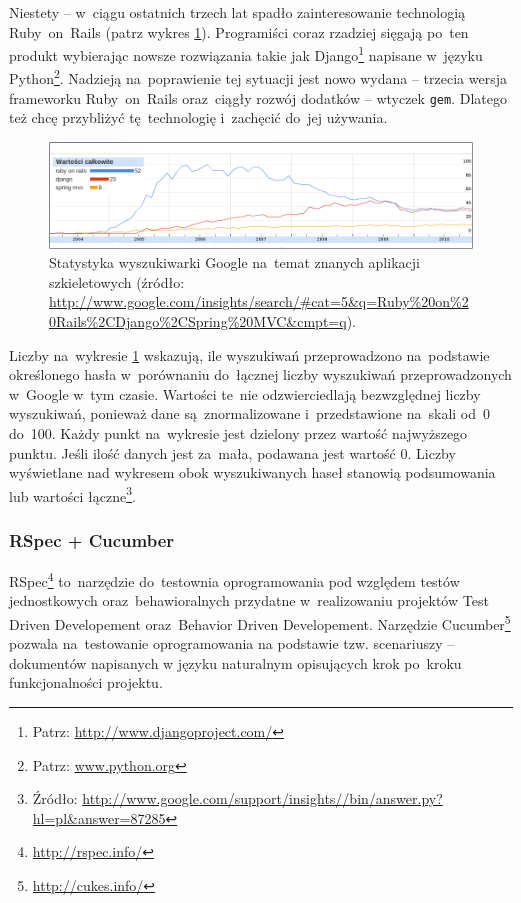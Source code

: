 Niestety -- w~ciągu ostatnich trzech lat spadło zainteresowanie technologią Ruby~on~Rails (patrz wykres \ref{fig.wykres.googleresearch}). Programiści coraz rzadziej sięgają po~ten produkt wybierając nowsze rozwiązania takie jak Django\footnote{Patrz: \url{http://www.djangoproject.com/}} napisane w~języku Python\footnote{Patrz: \url{www.python.org}}. Nadzieją na~poprawienie tej sytuacji jest nowo wydana -- trzecia wersja frameworku Ruby~on~Rails oraz~ciągły rozwój dodatków -- wtyczek \texttt{gem}. Dlatego też chcę przybliżyć tę~technologię i~zachęcić do~jej używania.

\begin{figure}[!t]
\centering
\includegraphics[width=\textwidth]{obrazki/googleresearch.png}
\caption{Statystyka wyszukiwarki Google na~temat znanych aplikacji szkieletowych (źródło: \url{http://www.google.com/insights/search/\#cat=5\&q=Ruby\%20on\%20Rails\%2CDjango\%2CSpring\%20MVC\&cmpt=q}).}
\label{fig.wykres.googleresearch}
\end{figure}

Liczby na~wykresie \ref{fig.wykres.googleresearch} wskazują, ile wyszukiwań przeprowadzono na~podstawie określonego hasła w~porównaniu do~łącznej liczby wyszukiwań przeprowadzonych w~Google w~tym czasie. Wartości te~nie odzwierciedlają bezwzględnej liczby wyszukiwań, ponieważ dane są~znormalizowane i~przedstawione na~skali od~0 do~100. Każdy punkt na~wykresie jest dzielony przez wartość najwyższego punktu. Jeśli ilość danych jest za~mała, podawana jest wartość 0. Liczby wyświetlane nad wykresem obok wyszukiwanych haseł stanowią podsumowania lub wartości łączne\footnote{Źródło: \url{http://www.google.com/support/insights//bin/answer.py?hl=pl\&answer=87285}}.

\subsubsection{RSpec + Cucumber}

RSpec\footnote{\url{http://rspec.info/}} to~narzędzie do~testownia oprogramowania pod względem testów jednostkowych oraz~behawioralnych przydatne w~realizowaniu projektów Test Driven Developement oraz~Behavior Driven Developement. Narzędzie Cucumber\footnote{\url{http://cukes.info/}} pozwala na~testowanie oprogramowania na podstawie tzw. scenariuszy -- dokumentów napisanych w języku naturalnym opisujących krok po~kroku funkcjonalności projektu.

